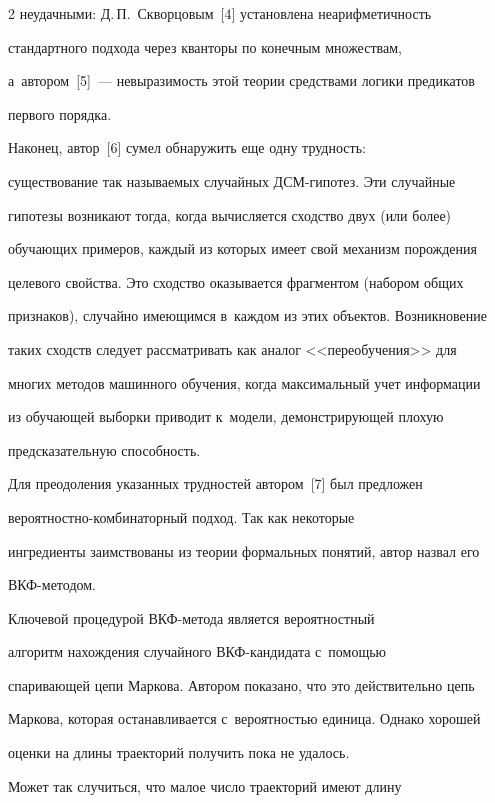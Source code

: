 \begin{multicols}{2}
неудачными: Д.\,П.~Сквор\-цовым~[4] установлена неарифметичность 

стандартного подхода через кванторы по конечным \mbox{множествам}, 

а~автором~[5]~--- невыразимость этой теории средствами логики предикатов 

первого порядка.

    

    Наконец, автор~[6] сумел обнаружить еще одну трудность: 

существование так называемых случайных ДСМ-ги\-по\-тез. Эти случайные 

гипотезы возникают тогда, когда вычисляется сходство двух (или более) 

обучающих примеров, каждый из которых имеет свой механизм порождения 

целевого свойства. Это сходство оказывается фрагментом (набором общих 

признаков), случайно имеющимся в~каждом из этих объектов. Возникновение 

таких сходств следует рассматривать как аналог <<пе\-ре\-обуче\-ния>> для 

многих методов машинного обуче\-ния, когда максимальный учет информации 

из обуча\-ющей выборки приводит к~модели, де\-мон\-ст\-ри\-ру\-ющей плохую 

предсказательную способность.

    

    Для преодоления указанных трудностей автором~[7] был предложен  

ве\-ро\-ят\-ност\-но-ком\-би\-на\-тор\-ный подход. Так как некоторые 

ингредиенты заимствованы из теории формальных понятий, автор назвал его 

ВКФ-ме\-то\-дом.

    

    Ключевой процедурой ВКФ-ме\-то\-да является вероятностный 

алгоритм нахождения случайного ВКФ-кан\-ди\-да\-та с~помощью 

спаривающей цепи Маркова. Автором показано, что это действительно цепь 

Маркова, которая останавливается с~вероятностью единица. Однако хорошей 

оценки на длины траекторий получить пока не удалось. 

    

    Может так случиться, что малое число траекторий имеют длину 


\end{multicols}

